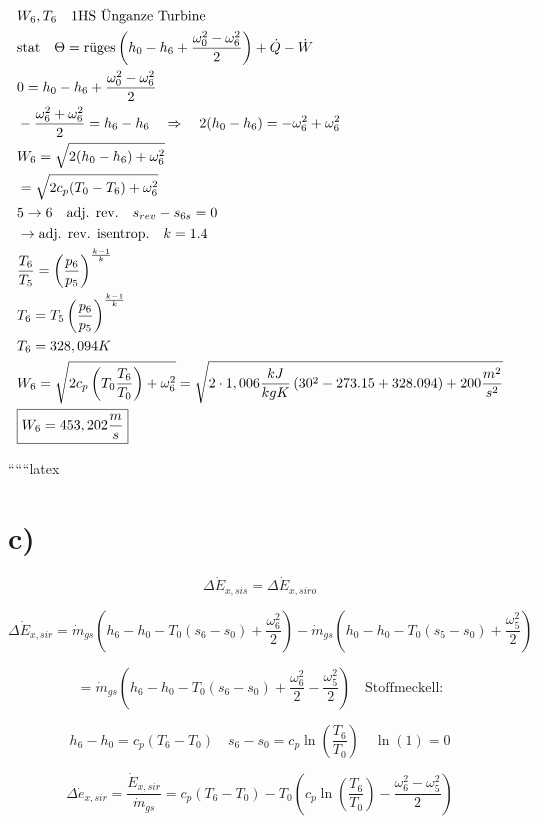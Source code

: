 \begin{align*}
    &W_6, T_6 \quad \text{1HS \text{Ü}nganze Turbine} \\
    &\text{stat} \quad \Theta = \text{r\text{ü}ges} \left( h_0 - h_6 + \frac{\omega_0^2 - \omega_6^2}{2} \right) + \dot{Q} - \dot{W} \\
    &0 = h_0 - h_6 + \frac{\omega_0^2 - \omega_6^2}{2} \\
    &- \frac{\omega_6^2 + \omega_6^2}{2} = h_6 - h_6 \quad \Rightarrow \quad 2(h_0 - h_6) = -\omega_6^2 + \omega_6^2 \\
    &W_6 = \sqrt{2(h_0 - h_6) + \omega_6^2} \\
    &= \sqrt{2c_p(T_0 - T_6) + \omega_6^2} \\
    &5 \rightarrow 6 \quad \text{adj. rev.} \quad s_{rev} - s_{6s} = 0 \\
    &\rightarrow \text{adj. rev. isentrop.} \quad k = 1.4 \\
    &\frac{T_6}{T_5} = \left( \frac{p_6}{p_5} \right)^{\frac{k-1}{k}} \\
    &T_6 = T_5 \left( \frac{p_6}{p_5} \right)^{\frac{k-1}{k}} \\
    &T_6 = 328,094 K \\
    &W_6 = \sqrt{2c_p \left( T_0 \frac{T_6}{T_0} \right) + \omega_6^2} = \sqrt{2 \cdot 1,006 \frac{kJ}{kgK} \left( 30^2 - 273.15 + 328.094 \right) + 200 \frac{m^2}{s^2}} \\
    &\boxed{W_6 = 453,202 \frac{m}{s}}
\end{align*}

``````latex


\section*{c)}

\[
\Delta \dot{E}_{x,sis} = \Delta \dot{E}_{x,siro}
\]

\[
\Delta \dot{E}_{x,sir} = \dot{m}_{gs} \left( h_6 - h_0 - T_0 (s_6 - s_0) + \frac{\omega_6^2}{2} \right) - \dot{m}_{gs} \left( h_0 - h_0 - T_0 (s_5 - s_0) + \frac{\omega_5^2}{2} \right)
\]

\[
= \dot{m}_{gs} \left( h_6 - h_0 - T_0 (s_6 - s_0) + \frac{\omega_6^2}{2} - \frac{\omega_5^2}{2} \right) \quad \text{Stoffmeckell:}
\]

\[
h_6 - h_0 = c_p (T_6 - T_0) \quad s_6 - s_0 = c_p \ln \left( \frac{T_6}{T_0} \right) \quad \ln(1) = 0
\]

\[
\Delta \dot{e}_{x,sir} = \frac{\dot{E}_{x,sir}}{\dot{m}_{gs}} = c_p (T_6 - T_0) - T_0 \left( c_p \ln \left( \frac{T_6}{T_0} \right) - \frac{\omega_6^2 - \omega_5^2}{2} \right)
\]


